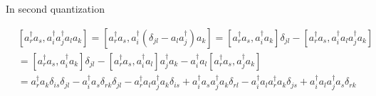 \documentclass[aps,preprint]{revtex4}%
\begin{document}
In second quantization%

\begin{align}
&  \left[  a_{r}^{\dagger}a_{s},a_{i}^{\dagger}a_{j}^{\dagger}a_{l}%
a_{k}\right]  =\left[  a_{r}^{\dagger}a_{s},a_{i}^{\dagger}\left(  \delta
_{jl}-a_{l}a_{j}^{\dagger}\right)  a_{k}\right]  =\left[  a_{r}^{\dagger}%
a_{s},a_{i}^{\dagger}a_{k}\right]  \delta_{jl}-\left[  a_{r}^{\dagger}%
a_{s},a_{i}^{\dagger}a_{l}a_{j}^{\dagger}a_{k}\right] \nonumber\\
&  =\left[  a_{r}^{\dagger}a_{s},a_{i}^{\dagger}a_{k}\right]  \delta
_{jl}-\left[  a_{r}^{\dagger}a_{s},a_{i}^{\dagger}a_{l}\right]  a_{j}%
^{\dagger}a_{k}-a_{i}^{\dagger}a_{l}\left[  a_{r}^{\dagger}a_{s}%
,a_{j}^{\dagger}a_{k}\right] \nonumber\\
&  =a_{r}^{\dagger}a_{k}\delta_{is}\delta_{jl}-a_{i}^{\dagger}a_{s}\delta
_{rk}\delta_{jl}-a_{r}^{\dagger}a_{l}a_{j}^{\dagger}a_{k}\delta_{is}%
+a_{i}^{\dagger}a_{s}a_{j}^{\dagger}a_{k}\delta_{rl}-a_{i}^{\dagger}a_{l}%
a_{r}^{\dagger}a_{k}\delta_{js}+a_{i}^{\dagger}a_{l}a_{j}^{\dagger}a_{s}%
\delta_{rk}%
\end{align}%
\end{document}
